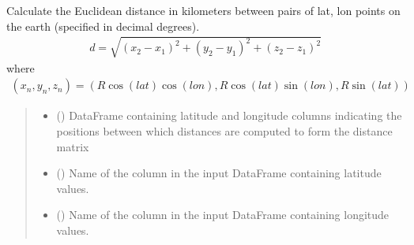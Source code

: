 \documentclass[letterpaper,10pt,english]{sphinxmanual}
\begin{document}
\begin{fulllineitems}
\label{\detokenize{misc:glomar_gridding.distances.euclidean_distance}}
\pysigstartsignatures
\pysiglinewithargsret
{}
{\sphinxparamcomma {}\sphinxparamcomma {}\sphinxparamcomma {}\sphinxparamcomma {}}
{}
\pysigstopsignatures
\sphinxAtStartPar
Calculate the Euclidean distance in kilometers between pairs of lat, lon
points on the earth (specified in decimal degrees).
\begin{equation*}
\begin{split}d = \sqrt{(x_2 - x_1)^2 + (y_2 - y_1)^2 + (z_2 - z_1)^2}\end{split}
\end{equation*}
\sphinxAtStartPar
where
\begin{equation*}
\begin{split}(x_n, y_n, z_n) = (R\cos(lat)\cos(lon), R\cos(lat)\sin(lon), R\sin(lat))\end{split}
\end{equation*}\begin{quote}\begin{description}
\begin{itemize}
\item {}
\sphinxAtStartPar
{} () \textendash{} DataFrame containing latitude and longitude columns indicating the
positions between which distances are computed to form the distance
matrix

\item {}
\sphinxAtStartPar
{} () \textendash{} Name of the column in the input DataFrame containing latitude values.

\item {}
\sphinxAtStartPar
{} () \textendash{} Name of the column in the input DataFrame containing longitude values.


\end{itemize}
\end{description}
\end{quote}
\end{fulllineitems}
\end{document}
